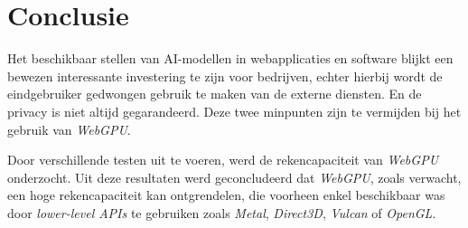 
\chapter{Conclusie}%
\label{ch:conclusie}





\iffalse
TODO Samen hang moet worden verbetert, alle zaken die hier besproken zijn geweest moeten zeker aan bod zijn gekomen in het onderzoek! Al dan niet verder in detail bespreken.
\fi

Het beschikbaar stellen van AI-modellen in webapplicaties en software blijkt een bewezen interessante investering te zijn voor bedrijven, echter hierbij wordt de eindgebruiker gedwongen gebruik te maken van de externe diensten. En de privacy is niet altijd gegarandeerd. Deze twee minpunten zijn te vermijden bij het gebruik van \textit{WebGPU}.

\bigbreak{}

Door verschillende testen uit te voeren, werd de rekencapaciteit van \textit{WebGPU} onderzocht. Uit deze resultaten werd geconcludeerd dat \textit{WebGPU}, zoals verwacht, een hoge rekencapaciteit kan ontgrendelen, die voorheen enkel beschikbaar was door \textit{lower-level APIs} te gebruiken zoals \textit{Metal}, \textit{Direct3D}, \textit{Vulcan} of \textit{OpenGL}.

